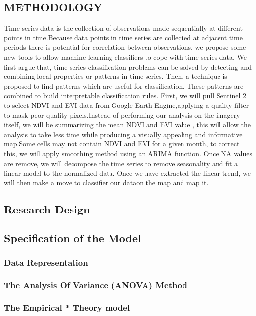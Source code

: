 \documentclass[12pt,a4paper]{article}
\begin{document}
\begin{flushleft}
		\section{METHODOLOGY}
		Time series data is the collection of observations made sequentially at different points in time.Because data points in time series are collected at adjacent time periods there is potential for correlation between observations. we propose some new tools to allow machine learning classifiers to cope with time series data. We first argue that, time-series classification problems can be solved by detecting and combining local properties or patterns in time series. Then, a technique is proposed to find patterns which are useful for classification. These patterns are combined to build interpretable classification rules.
		First, we will pull Sentinel 2 to select NDVI and EVI data from Google Earth Engine,applying a quality filter to mask poor quality pixels.Instead of performing our analysis on the imagery itself, we will be summarizing the mean NDVI and EVI value , this will allow the analysis to take less time while producing a visually appealing and informative map.Some cells may not contain NDVI and EVI for a given month, to correct this, we will apply smoothing method using an ARIMA function.
		Once NA values are remove, we will decompose the time series to remove seasonality and fit a linear model to the normalized data.
		Once we have extracted the linear trend, we will then make a move to classifier our dataon the map and map it.
		
		\subsection{Research Design}
		\subsection{Specification of the Model}
		\subsubsection{Data Representation}
		\subsubsection{The Analysis Of Variance (ANOVA) Method}
		\subsubsection{The Empirical * Theory model}

\end{flushleft}
\end{document}
